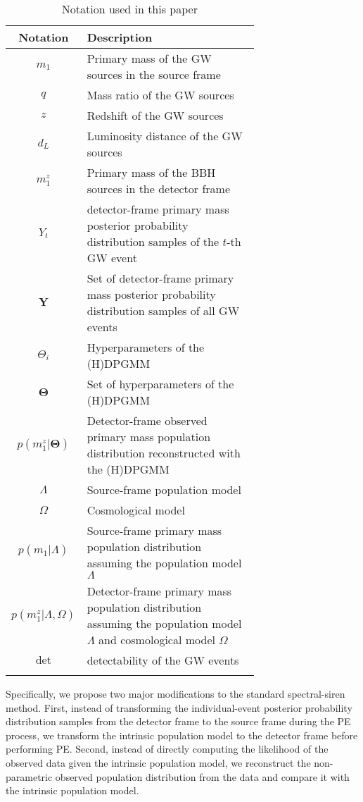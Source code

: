 \documentclass[sn-aps, pdflatex, iicol]{sn-jnl}
\begin{document}
\begin{table}[htbp]
    \caption{Notation used in this paper}
    \begin{tabular}{cp{0.7\linewidth}}
        \toprule
        Notation & Description \\
        \midrule
        $m_1$ & Primary mass of the \ac{GW} sources in the source frame \\
        $q$ & Mass ratio of the \ac{GW} sources \\
        $z$ & Redshift of the \ac{GW} sources \\
        $d_L$ & Luminosity distance of the \ac{GW} sources \\
        $m^z_1$ & Primary mass of the \ac{BBH} sources in the detector frame \\
        $Y_t$ & detector-frame primary mass posterior probability distribution samples of the $t$-th \ac{GW} event \\
        $\mathbf{Y}$ & Set of detector-frame primary mass posterior probability distribution samples of all \ac{GW} events \\
        $\Theta_i$ & Hyperparameters of the \ac{(H)DPGMM} \\
        $\mathbf{\Theta}$ & Set of hyperparameters of the \ac{(H)DPGMM} \\
        $p(m^z_1|\mathbf{\Theta})$ & Detector-frame observed primary mass population distribution reconstructed with the \ac{(H)DPGMM} \\
        $\Lambda$ & Source-frame population model \\
        $\Omega$ & Cosmological model \\
        $p(m_1|\Lambda)$ & Source-frame primary mass population distribution assuming the population model $\Lambda$ \\
        $p(m^z_1|\Lambda, \Omega)$ & Detector-frame primary mass population distribution assuming the population model $\Lambda$ and cosmological model $\Omega$ \\
        $\mathrm{det}$ & detectability of the \ac{GW} events \\
        \botrule
    \end{tabular}
    \label{tab:notation}
\end{table}

Specifically, we propose two major modifications to the standard spectral-siren method.
First, instead of transforming the individual-event posterior probability distribution samples from the detector frame to the source frame during the \ac{PE} process, we transform the intrinsic population model to the detector frame before performing \ac{PE}.
Second, instead of directly computing the likelihood of the observed data given the intrinsic population model, we reconstruct the non-parametric observed population distribution from the data and compare it with the intrinsic population model.
\end{document}
